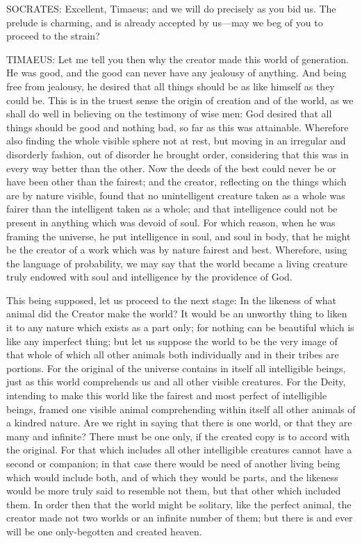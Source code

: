 SOCRATES: Excellent, Timaeus; and we will do precisely as you bid us. The
prelude is charming, and is already accepted by us—may we beg of you
to proceed to the strain?

TIMAEUS: Let me tell you then why the creator made this world of
generation. He was good, and the good can never have any jealousy of
anything. And being free from jealousy, he desired that all things should
be as like himself as they could be. This is in the truest sense the
origin of creation and of the world, as we shall do well in believing on
the testimony of wise men: God desired that all things should be good and
nothing bad, so far as this was attainable. Wherefore also finding the
whole visible sphere not at rest, but moving in an irregular and
disorderly fashion, out of disorder he brought order, considering that
this was in every way better than the other. Now the deeds of the best
could never be or have been other than the fairest; and the creator,
reflecting on the things which are by nature visible, found that no
unintelligent creature taken as a whole was fairer than the intelligent
taken as a whole; and that intelligence could not be present in anything
which was devoid of soul. For which reason, when he was framing the
universe, he put intelligence in soul, and soul in body, that he might be
the creator of a work which was by nature fairest and best. Wherefore,
using the language of probability, we may say that the world became a
living creature truly endowed with soul and intelligence by the providence
of God.

This being supposed, let us proceed to the next stage: In the likeness of
what animal did the Creator make the world? It would be an unworthy thing
to liken it to any nature which exists as a part only; for nothing can be
beautiful which is like any imperfect thing; but let us suppose the world
to be the very image of that whole of which all other animals both
individually and in their tribes are portions. For the original of the
universe contains in itself all intelligible beings, just as this world
comprehends us and all other visible creatures. For the Deity, intending
to make this world like the fairest and most perfect of intelligible
beings, framed one visible animal comprehending within itself all other
animals of a kindred nature. Are we right in saying that there is one
world, or that they are many and infinite? There must be one only, if the
created copy is to accord with the original. For that which includes all
other intelligible creatures cannot have a second or companion; in that
case there would be need of another living being which would include both,
and of which they would be parts, and the likeness would be more truly
said to resemble not them, but that other which included them. In order
then that the world might be solitary, like the perfect animal, the
creator made not two worlds or an infinite number of them; but there is
and ever will be one only-begotten and created heaven.

